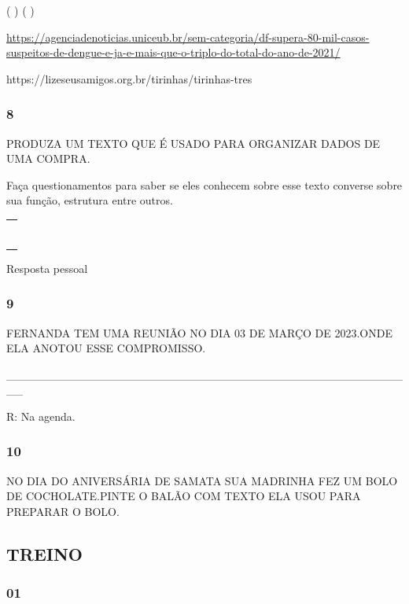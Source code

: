 ( ) ( )

\url{https://agenciadenoticias.uniceub.br/sem-categoria/df-supera-80-mil-casos-suspeitos-de-dengue-e-ja-e-mais-que-o-triplo-do-total-do-ano-de-2021/}

https://lizeseusamigos.org.br/tirinhas/tirinhas-tres

\subsubsection{8 }\label{section-49}

PRODUZA UM TEXTO QUE É USADO PARA ORGANIZAR DADOS DE UMA COMPRA.

Faça questionamentos para saber se eles conhecem sobre esse texto
converse sobre sua função, estrutura entre outros.

\begin{longtable}[]{@{}l@{}}
\toprule
\tabularnewline
\tabularnewline
\tabularnewline
\tabularnewline
\tabularnewline
\tabularnewline
\tabularnewline
\bottomrule
\end{longtable}

Resposta pessoal

\subsubsection{9 }\label{section-50}

FERNANDA TEM UMA REUNIÃO NO DIA 03 DE MARÇO DE 2023.ONDE ELA ANOTOU ESSE
COMPROMISSO.

\_\_\_\_\_\_\_\_\_\_\_\_\_\_\_\_\_\_\_\_\_\_\_\_\_\_\_\_\_\_\_\_\_\_\_\_\_\_\_\_\_\_\_\_\_\_\_\_\_\_

R: Na agenda.

\subsubsection{10 }\label{section-51}

NO DIA DO ANIVERSÁRIA DE SAMATA SUA MADRINHA FEZ UM BOLO DE
COCHOLATE.PINTE O BALÃO COM TEXTO ELA USOU PARA PREPARAR O BOLO.

\subsection{TREINO}\label{treino-3}

\subsubsection{01}\label{section-52}

